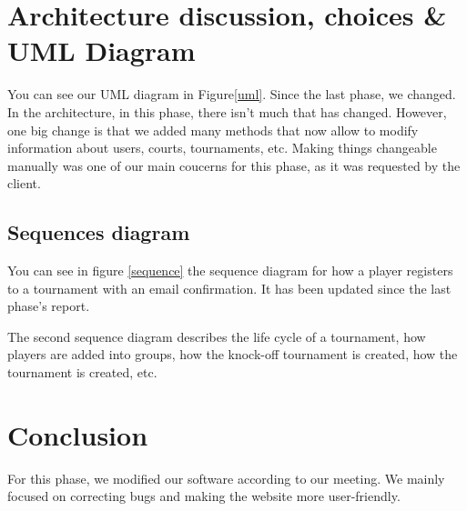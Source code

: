 \documentclass[a4paper, 12pt]{article}
\begin{document}
\newpage
\section{Architecture discussion, choices \& UML Diagram}

You can see our UML diagram in Figure\ref{uml}. Since the last phase, we changed.\\

In the architecture, in this phase, there isn't much that has changed. However, one big change is that we added many methods that now allow to modify information about users, courts, tournaments, etc. Making things changeable manually was one of our main coucerns for this phase, as it was requested by the client.

\subsection*{Sequences diagram}

You can see in figure \ref{sequence} the sequence diagram for how a player registers to a tournament with an email confirmation. It has been updated since the last phase's report.

The second sequence diagram describes the life cycle of a tournament, how players are added into groups, how the knock-off tournament is created, how the tournament is created, etc. 



\section{Conclusion}

For this phase, we modified our software according to our meeting. We mainly focused on correcting bugs and making the website more user-friendly.
\end{document}
